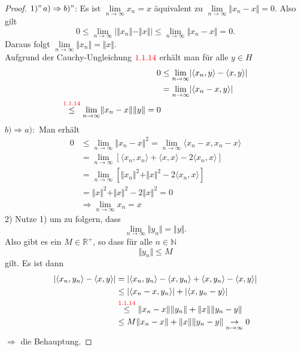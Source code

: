 \documentclass[12pt,titlepage]{article}
\numberwithin{equation}{section}
\begin{document}
\begin{proof}
$1)"\, a) \Rightarrow b)"$: Es ist $\underset{n \rightarrow \infty}{\lim} x_n =x$ äquivalent zu $\underset{n \rightarrow \infty}{\lim} \Vert x_n -x\Vert=0$. Also gilt 
\[
0 \leq \underset{n \rightarrow \infty}{\lim} \vert \Vert x_n \Vert  -\Vert x\Vert \vert \leq \underset{n \rightarrow \infty}{\lim} \Vert x_n -x\Vert =0.
\]
Daraus folgt $\underset{n \rightarrow \infty}{\lim}\Vert  x_n \Vert =\Vert x \Vert$.\\
Aufgrund der Cauchy-Ungleichung $\textcolor{red}{1.1.14}$ erhält man für alle $y \in H$
\begin{align*}
0 &\leq \underset{n \rightarrow \infty}{\lim} \vert \langle x_n , y \rangle - \langle x,y\rangle\vert \\
&= \underset{n \rightarrow \infty}{\lim}\vert \langle x_n -x,y\rangle \vert\\
\overset{\textcolor{red}{1.1.14}}{\leq} \underset{n \rightarrow \infty}{\lim}\Vert x_n-x\Vert \Vert y\Vert=0
\end{align*}
$b) \Rightarrow a):$ Man erhält 
\begin{align*}
0 &\leq \underset{n \rightarrow \infty}{\lim} \Vert x_n -x \Vert^2 =\underset{n \rightarrow \infty}{\lim} \langle x_n-x, x_n-x \rangle\\
&=\underset{n \rightarrow \infty}{\lim} [\langle x_n, x_n \rangle+\langle x,x \rangle-2\langle x_n, x \rangle]\\
&=\underset{n \rightarrow \infty}{\lim} [\Vert x_n \Vert^2 +\Vert x \Vert^2 -2\langle x_n, x \rangle] \\
&=\Vert x \Vert^2+\Vert x \Vert^2-2\Vert x \Vert^2=0\\
&\Rightarrow \underset{n \rightarrow \infty}{\lim} x_n=x 
\end{align*}
2) Nutze 1) um zu folgern, dass 
\[
\underset{n \rightarrow \infty}{\lim} \Vert y_n\Vert=\Vert y\Vert.
\] Also gibt es ein $M \in \mathbb{R}^+$, so dass für alle $n\in \mathbb{N}$ 
\[
\Vert y_n\Vert \leq M
\]gilt. Es ist dann 
\begin{align*}
\vert \langle x_n,y_n \rangle-\langle x,y \rangle\vert&=\vert \langle x_n,y_n\rangle-\langle x,y_n \rangle+\langle x,y_n\rangle-\langle x,y \rangle\vert\\
&\leq \vert \langle x_n-x,y_n \rangle\vert +\vert \langle x,y_n-y \rangle \vert \\
&\overset{\textcolor{red}{1.1.14}}{\leq} \Vert x_n-x\Vert \Vert y_n\Vert+\Vert x\Vert\Vert y_n-y \Vert\\
&\leq M\Vert x_n-x\Vert +\Vert x\Vert\Vert y_n-y \Vert \underset{n \rightarrow \infty}{\rightarrow} 0
\end{align*}
$\Rightarrow$ die Behauptung.
\end{proof}
\end{document}
